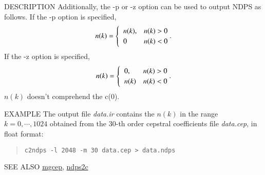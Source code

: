 \begin{qsection}{DESCRIPTION}
Additionally, the -p or -z option can be used to output NDPS as follows.
If the -p option is specified,
\begin{align}
n(k) = \begin{cases} \;\; \displaystyle
	n(k), & n(k) > 0 \\
	\;\;\displaystyle 0 & n(k) < 0
       \end{cases}. \notag
\end{align}
If the -z option is specified,
\begin{align}
n(k) = \begin{cases} \;\; \displaystyle
	0, & n(k) > 0 \\
	\;\;\displaystyle n(k) & n(k) < 0
       \end{cases}. \notag
\end{align}
$n(k)$ doesn't comprehend the c(0).
\end{qsection}

\begin{options}
\end{options}

\begin{qsection}{EXAMPLE}
The output file {\em data.ir} contains the $n(k)$
in the range $k = 0,\cdots,1024$ obtained from the 30-th order cepstral
coefficients file {\em data.cep}, in float format:
 \begin{quote}
  \verb!c2ndps -l 2048 -m 30 data.cep > data.ndps!
 \end{quote}
\end{qsection}

\begin{qsection}{SEE ALSO}
\hyperlink{mgcep}{mgcep},
\hyperlink{ndps2c}{ndps2c}
\end{qsection}
